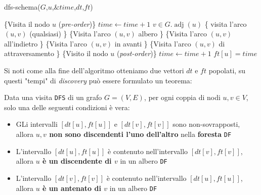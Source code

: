             \begin{algorithm}
                \label{alg:dfs-schema}
                \caption{dfs-schema(\Graph $G$,\Node $u$,\Int $\&time$,\Int[] $dt$,\Int[] $ft$)}
                \begin{algorithmic}
                    \State \{Visita il nodo $u$ (\textit{pre-order})\}
                    \State $ time \gets time + 1$
                    \ForEach $v\in G.\operatorname{adj}(u)$
                        \State \{ visita l'arco $(u,v)$ (qualsiasi) \}
                            
                            \State \{Visita l'arco $(u,v)$ albero \}
                            \State {}
                         
                            \State \{Visita l'arco $(u,v)$ all'indietro \}
                         
                            \State \{Visita l'arco $(u,v)$ in avanti \}
                        \Else {}
                            \State \{Visita l'arco $(u,v)$ di attraversamento \}
                        \EndIf
                    \EndFor
                    \State \{Visito il nodo $u$ (\textit{post-order})\}
                    \State $time\gets time+1$
                    \State $ft[u]=time$
                \end{algorithmic}
            \end{algorithm}
            Si noti come alla fine dell'algoritmo otteniamo due vettori $dt$ e $ft$ popolati, su questi "tempi" di \textit{discovery} può essere formulato un teorema:
            \begin{theorem}
                Data una visita \texttt{DFS} di un grafo $G=(V,E)$, per ogni coppia di nodi $u,v\in V$, solo una delle seguenti condizioni è vera:
                \begin{itemize}
                    \item GLi intervalli $[dt[u],ft[u]]$ e $[dt[v],ft[v]]$ sono non-sovrapposti, allora \textbf{$u,v$ non sono discendenti l'uno dell'altro} nella \textbf{foresta} \texttt{DF}
                    \item L'intervallo $[dt[u],ft[u]]$ è contenuto nell'intervallo $[dt[v],ft[v]]$, allora \textbf{$u$ è un discendente di $v$} in un albero \texttt{DF}
                    \item L'intervallo $[dt[v],ft[v]]$ è contenuto nell'intervallo $[dt[u],ft[u]]$, allora \textbf{$u$ è un antenato di $v$} in un albero \texttt{DF}
                \end{itemize}
            \end{theorem}
